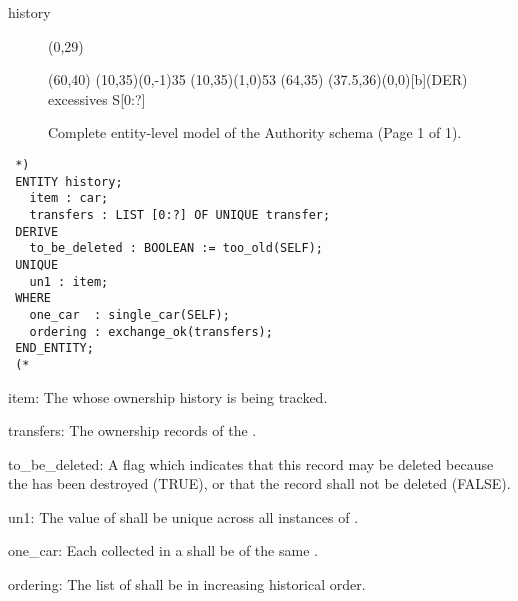 \documentclass{article}
\begin{document}
\begin{Mnamedesc}{history}
\begin{figure}[tbp]
\begin{picture}
{\begin{picture}
   \put(0,29){\begin{picture}(60,40)
     \put(10,35){\line(0,-1){35}}
     \put(10,35){\line(1,0){53}}
     \put(64,35){}
     \put(37.5,36){\makebox(0,0)[b]{(DER) excessives S[0:?]}}
     \end{picture}}

   \end{picture}}  %

 \end{picture}
 \setlength{\unitlength}{1pt}
 \caption{Complete entity-level model of the Authority schema (Page 1 of 1).}
 \label{fig:cargreg}
 \end{figure}


 \begin{Mexp}
 \begin{verbatim}
 *)
 ENTITY history;
   item : car;
   transfers : LIST [0:?] OF UNIQUE transfer;
 DERIVE
   to_be_deleted : BOOLEAN := too_old(SELF);
 UNIQUE
   un1 : item;
 WHERE
   one_car  : single_car(SELF);
   ordering : exchange_ok(transfers);
 END_ENTITY;
 (*
 \end{verbatim}
 \end{Mexp}

 \begin{Matts}

 \item[item:] The  whose ownership history is being tracked.

 \item[transfers:] The ownership  records of the .

 \item[to\_be\_deleted:] A flag which indicates that this  record
 may be deleted because the  has been destroyed (TRUE), or that the
 record shall not be deleted (FALSE).

 \end{Matts}

 \begin{Mprops}

 \item[un1:] The value of  shall be unique across all instances of
 .

 \item[one\_car:] Each  collected in a  shall be
 of the same .

 \item[ordering:] The list of  shall be in increasing historical
 order.

 \end{Mprops}

 \end{Mnamedesc}
\end{document}
